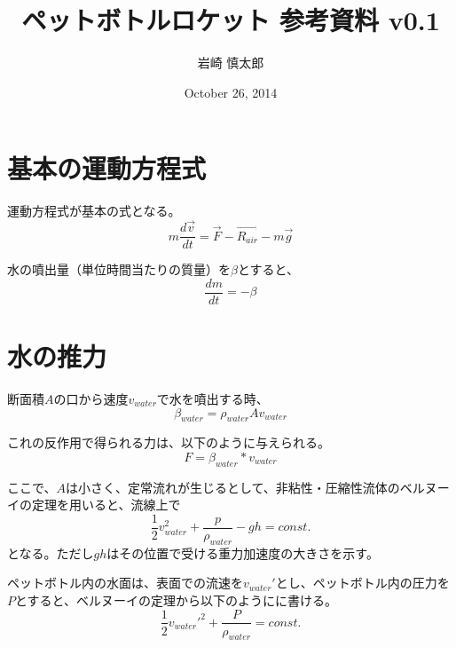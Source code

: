 \documentclass{article}
\title{ ペットボトルロケット 参考資料 v0.1 }
\author{ 岩崎 慎太郎 }
\begin{document}
\date{October 26, 2014}
\maketitle

\section{ 基本の運動方程式 }
運動方程式が基本の式となる。
\begin{equation}
m \frac{d \vec{v}}{d t} = \vec{F} - \vec{R_{air}} - m \vec{g}
\end{equation}

水の噴出量（単位時間当たりの質量）を$\beta$とすると、
\begin{equation}
\frac{d m}{d t} = -\beta
\end{equation}

\section{ 水の推力 }

断面積$A$の口から速度$v_{water}$で水を噴出する時、
\begin{equation}
\beta_{water} = \rho_{water} A v_{water}
\end{equation}

これの反作用で得られる力は、以下のように与えられる。
\begin{equation}
F = \beta_{water} * v_{water}
\end{equation}

ここで、$A$は小さく、定常流れが生じるとして、非粘性・圧縮性流体のベルヌーイの定理を用いると、流線上で
\begin{equation}
\frac{1}{2} v_{water}^2 + \frac{p}{\rho_{water}} - g h = const.
\end{equation}
となる。ただし$g h$はその位置で受ける重力加速度の大きさを示す。

ペットボトル内の水面は、表面での流速を$v_{water}'$とし、ペットボトル内の圧力を$P$とすると、ベルヌーイの定理から以下のようにに書ける。
\begin{equation}
\frac{1}{2} v_{water}'^2 + \frac{P}{\rho_{water}} = const.
\end{equation}
\end{document}
